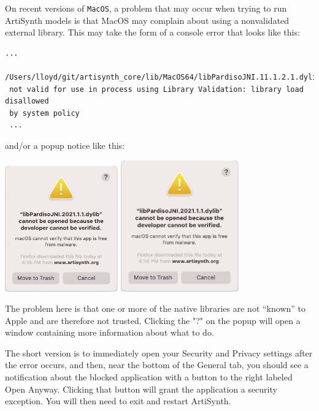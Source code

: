 \documentclass{article}
\begin{document}
On recent versions of {\tt MacOS}, a problem that may occur when trying to run
ArtiSynth models is that MacOS may complain about using a nonvalidated external
library. This may take the form of a console error that looks like this:
%
\begin{lstlisting}[]
 ...
 /Users/lloyd/git/artisynth_core/lib/MacOS64/libPardisoJNI.11.1.2.1.dylib)
 not valid for use in process using Library Validation: library load disallowed
 by system policy 
 ...
\end{lstlisting}
%
and/or a popup notice like this:
\begin{center}
\iflatexml
  \includegraphics[]{images/MacSecurityNotice}
\else
  \includegraphics[width=2in]{images/MacSecurityNotice}
\fi
\end{center}
The problem here is that one or more of the native libraries are not ``known''
to Apple and are therefore not trusted. Clicking the "?" on the popup will
open a window containing more information about what to do.

The short version is to immediately open your Security and Privacy
settings after the error occurs, and then, near the bottom of the {\sf
General} tab, you should see a notification about the blocked
application with a button to the right labeled {\sf Open
Anyway}. Clicking that button will grant the application a security
exception. You will then need to exit and restart ArtiSynth.
\end{document}
